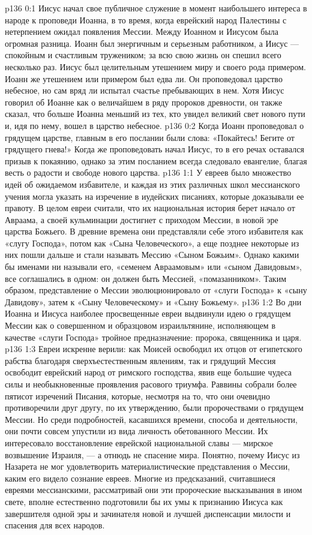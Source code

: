 \author{Комиссия срединников}
\vs p136 0:1 Иисус начал свое публичное служение в момент наибольшего интереса в народе к проповеди Иоанна, в то время, когда еврейский народ Палестины с нетерпением ожидал появления Мессии. Между Иоанном и Иисусом была огромная разница. Иоанн был энергичным и серьезным работником, а Иисус --- спокойным и счастливым тружеником; за всю свою жизнь он спешил всего несколько раз. Иисус был целительным утешением миру и своего рода примером. Иоанн же утешением или примером был едва ли. Он проповедовал царство небесное, но сам вряд ли испытал счастье пребывающих в нем. Хотя Иисус говорил об Иоанне как о величайшем в ряду пророков древности, он также сказал, что больше Иоанна меньший из тех, кто увидел великий свет нового пути и, идя по нему, вошел в царство небесное.
\vs p136 0:2 Когда Иоанн проповедовал о грядущем царстве, главным в его послании были слова: «Покайтесь! Бегите от грядущего гнева!» Когда же проповедовать начал Иисус, то в его речах оставался призыв к покаянию, однако за этим посланием всегда следовало евангелие, благая весть о радости и свободе нового царства.
\vs p136 1:1 У евреев было множество идей об ожидаемом избавителе, и каждая из этих различных школ мессианского учения могла указать на изречение в иудейских писаниях, которые доказывали ее правоту. В целом евреи считали, что их национальная история берет начало от Авраама, а своей кульминации достигнет с приходом Мессии, в новой эре царства Божьего. В древние времена они представляли себе этого избавителя как «слугу Господа», потом как «Сына Человеческого», а еще позднее некоторые из них пошли дальше и стали называть Мессию «Сыном Божьим». Однако какими бы именами ни называли его, «семенем Авраамовым» или «сыном Давидовым», все соглашались в одном: он должен быть Мессией, «помазанником». Таким образом, представление о Мессии эволюционировало от «слуги Господа» к «сыну Давидову», затем к «Сыну Человеческому» и «Сыну Божьему».
\vs p136 1:2 Во дни Иоанна и Иисуса наиболее просвещенные евреи выдвинули идею о грядущем Мессии как о совершенном и образцовом израильтянине, исполняющем в качестве «слуги Господа» тройное предназначение: пророка, священника и царя.
\vs p136 1:3 Евреи искренне верили: как Моисей освободил их отцов от египетского рабства благодаря сверхъестественным явлениям, так и грядущий Мессия освободит еврейский народ от римского господства, явив еще большие чудеса силы и необыкновенные проявления расового триумфа. Раввины собрали более пятисот изречений Писания, которые, несмотря на то, что они очевидно противоречили друг другу, по их утверждению, были пророчествами о грядущем Мессии. Но среди подробностей, касавшихся времени, способа и деятельности, они почти совсем упустили из вида личность обетованного Мессии. Их интересовало восстановление еврейской национальной славы --- мирское возвышение Израиля, --- а отнюдь не спасение мира. Понятно, почему Иисус из Назарета не мог удовлетворить материалистические представления о Мессии, каким его видело сознание евреев. Многие из предсказаний, считавшиеся евреями мессианскими, рассматривай они эти пророческие высказывания в ином свете, вполне естественно подготовили бы их умы к признанию Иисуса как завершителя одной эры и зачинателя новой и лучшей диспенсации милости и спасения для всех народов.
